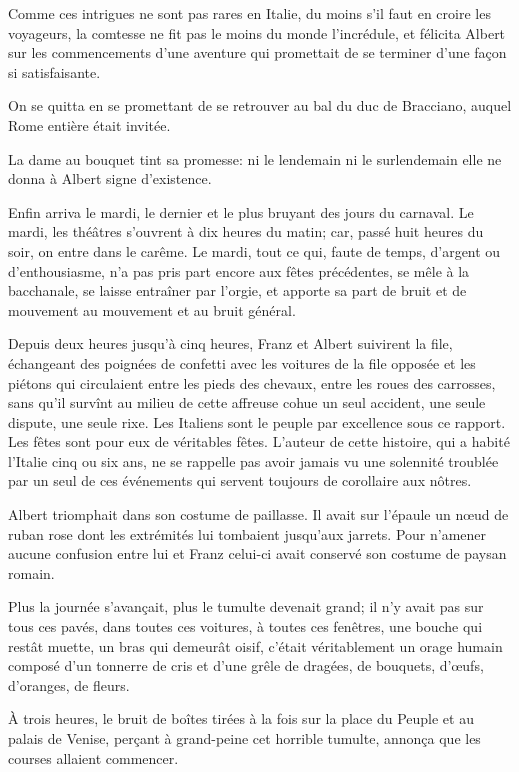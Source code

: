 Comme ces intrigues ne sont pas rares en Italie, du moins s'il faut en croire les voyageurs, la comtesse ne fit pas le moins du monde l'incrédule, et félicita Albert sur les commencements d'une aventure qui promettait de se terminer d'une façon si satisfaisante. 

On se quitta en se promettant de se retrouver au bal du duc de Bracciano, auquel Rome entière était invitée. 

La dame au bouquet tint sa promesse: ni le lendemain ni le surlendemain elle ne donna à Albert signe d'existence. 

Enfin arriva le mardi, le dernier et le plus bruyant des jours du carnaval. Le mardi, les théâtres s'ouvrent à dix heures du matin; car, passé huit heures du soir, on entre dans le carême. Le mardi, tout ce qui, faute de temps, d'argent ou d'enthousiasme, n'a pas pris part encore aux fêtes précédentes, se mêle à la bacchanale, se laisse entraîner par l'orgie, et apporte sa part de bruit et de mouvement au mouvement et au bruit général. 

Depuis deux heures jusqu'à cinq heures, Franz et Albert suivirent la file, échangeant des poignées de confetti avec les voitures de la file opposée et les piétons qui circulaient entre les pieds des chevaux, entre les roues des carrosses, sans qu'il survînt au milieu de cette affreuse cohue un seul accident, une seule dispute, une seule rixe. Les Italiens sont le peuple par excellence sous ce rapport. Les fêtes sont pour eux de véritables fêtes. L'auteur de cette histoire, qui a habité l'Italie cinq ou six ans, ne se rappelle pas avoir jamais vu une solennité troublée par un seul de ces événements qui servent toujours de corollaire aux nôtres. 

Albert triomphait dans son costume de paillasse. Il avait sur l'épaule un nœud de ruban rose dont les extrémités lui tombaient jusqu'aux jarrets. Pour n'amener aucune confusion entre lui et Franz celui-ci avait conservé son costume de paysan romain. 

Plus la journée s'avançait, plus le tumulte devenait grand; il n'y avait pas sur tous ces pavés, dans toutes ces voitures, à toutes ces fenêtres, une bouche qui restât muette, un bras qui demeurât oisif, c'était véritablement un orage humain composé d'un tonnerre de cris et d'une grêle de dragées, de bouquets, d'œufs, d'oranges, de fleurs. 

À trois heures, le bruit de boîtes tirées à la fois sur la place du Peuple et au palais de Venise, perçant à grand-peine cet horrible tumulte, annonça que les courses allaient commencer. 


